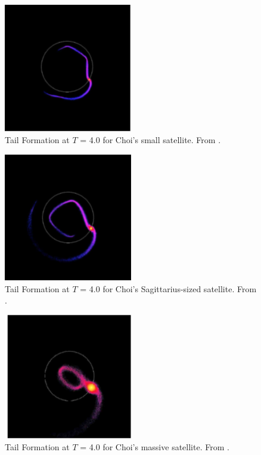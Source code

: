 \documentclass[twocolumn]{article}
\begin{document}
\begin{figure}
	\centering
	\includegraphics[width=0.5\textwidth]{choi_small.png}	
	\caption{Tail Formation at $T$ = 4.0 for Choi's small satellite. From \cite{dynamicsOfTidalTails}. }
	\label{fig:choi_small}
\end{figure}

\begin{figure}
	\centering
	\includegraphics[width=0.5\textwidth]{choi_medium.png}	
	\caption{Tail Formation at $T$ = 4.0 for Choi's Sagittarius-sized satellite. From \cite{dynamicsOfTidalTails}.}
	\label{fig:choi_medium}
\end{figure}

\begin{figure}
	\centering
	\includegraphics[width=0.5\textwidth]{choi_large.png}	
	\caption{Tail Formation at $T$ = 4.0 for Choi's massive satellite. From \cite{dynamicsOfTidalTails}.}
	\label{fig:choi_large}
\end{figure}
\end{document}
